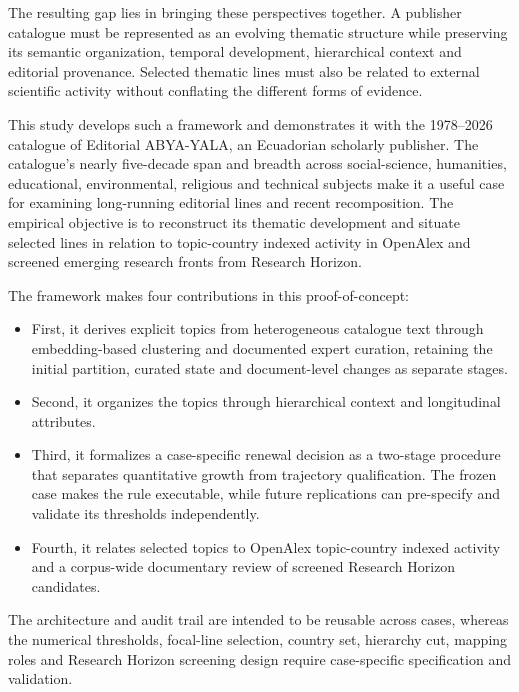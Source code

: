 \documentclass[futureinternet,article,submit,moreauthors]{Definitions/mdpi}
\newcommand{\ABYA}{ABYA-YALA\xspace}
\begin{document}
The resulting gap lies in bringing these perspectives together. A publisher catalogue must be represented as an evolving thematic structure while preserving its semantic organization, temporal development, hierarchical context and editorial provenance. Selected thematic lines must also be related to external scientific activity without conflating the different forms of evidence.

This study develops such a framework and demonstrates it with the 1978--2026 catalogue of Editorial \ABYA, an Ecuadorian scholarly publisher. The catalogue's nearly five-decade span and breadth across social-science, humanities, educational, environmental, religious and technical subjects make it a useful case for examining long-running editorial lines and recent recomposition. The empirical objective is to reconstruct its thematic development and situate selected lines in relation to topic-country indexed activity in OpenAlex and screened emerging research fronts from Research Horizon.

The framework makes four contributions in this proof-of-concept:
\begin{itemize} 
    \item First, it derives explicit topics from heterogeneous catalogue text through embedding-based clustering and documented expert curation, retaining the initial partition, curated state and document-level changes as separate stages. 
    \item Second, it organizes the topics through hierarchical context and longitudinal attributes. 
    \item Third, it formalizes a case-specific renewal decision as a two-stage procedure that separates quantitative growth from trajectory qualification. The frozen case makes the rule executable, while future replications can pre-specify and validate its thresholds independently. 
    \item Fourth, it relates selected topics to OpenAlex topic-country indexed activity and a corpus-wide documentary review of screened Research Horizon candidates. %
\end{itemize}

The architecture and audit trail are intended to be reusable across cases, whereas the numerical thresholds, focal-line selection, country set, hierarchy cut, mapping roles and Research Horizon screening design require case-specific specification and validation.
\end{document}
